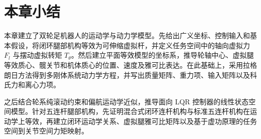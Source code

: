 \section{本章小结}

本章建立了双轮足机器人的运动学与动力学模型。先给出广义坐标、控制输入和基本假设，将闭环腿部机构等效为可伸缩虚拟杆，并定义任务空间中的轴向虚拟力 $F_l$ 与摆动虚拟转矩 $T_\theta$。然后建立平面等效模型的坐标系，推导轮轴中心、虚拟腿等效质心、髋关节和机体质心的位置、速度及雅可比表达。在此基础上，采用拉格朗日方法得到多刚体系统动力学方程，并写出质量矩阵、重力项、输入矩阵以及科氏力和离心力项。

之后结合轮系纯滚动约束和偏航运动学近似，推导面向 LQR 控制器的线性状态空间模型。针对五连杆腿部机构，先证明混合式闭环连杆机构与标准五连杆机构在运动学上等效，再建立闭环运动学关系、虚拟腿雅可比矩阵以及基于虚功原理的任务空间到关节空间力矩映射。
